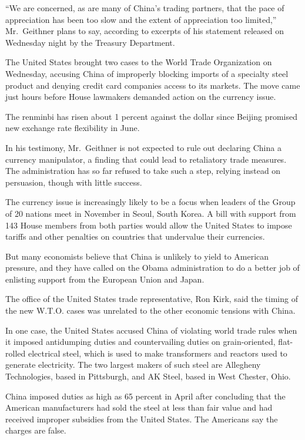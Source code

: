 ﻿\documentclass[12pt]{article}
\begin{document}
``We are concerned, as are many of China's trading partners, that the pace of appreciation has been
too slow and the extent of appreciation too limited,'' Mr.~Geithner plans to say, according to
excerpts of his statement released on Wednesday night by the Treasury Department.

The United States brought two cases to the World Trade Organization on Wednesday, accusing China of
improperly blocking imports of a specialty steel product and denying credit card companies access to
its markets. The move came just hours before House lawmakers demanded action on the currency issue.

The renminbi has risen about 1 percent against the dollar since Beijing promised new exchange rate
flexibility in June.

In his testimony, Mr.~Geithner is not expected to rule out declaring China a currency manipulator, a
finding that could lead to retaliatory trade measures. The administration has so far refused to take
such a step, relying instead on persuasion, though with little success.

The currency issue is increasingly likely to be a focus when leaders of the Group of 20 nations meet
in November in Seoul, South Korea. A bill with support from 143 House members from both parties
would allow the United States to impose tariffs and other penalties on countries that undervalue
their currencies.

But many economists believe that China is unlikely to yield to American pressure, and they have
called on the Obama administration to do a better job of enlisting support from the European Union
and Japan.

The office of the United States trade representative, Ron Kirk, said the timing of the new W.T.O.
cases was unrelated to the other economic tensions with China.

In one case, the United States accused China of violating world trade rules when it imposed
antidumping duties and countervailing duties on grain-oriented, flat-rolled electrical steel, which
is used to make transformers and reactors used to generate electricity. The two largest makers of
such steel are Allegheny Technologies, based in Pittsburgh, and AK Steel, based in West Chester,
Ohio.

China imposed duties as high as 65 percent in April after concluding that the American manufacturers
had sold the steel at less than fair value and had received improper subsidies from the United
States. The Americans say the charges are false.
\end{document}
